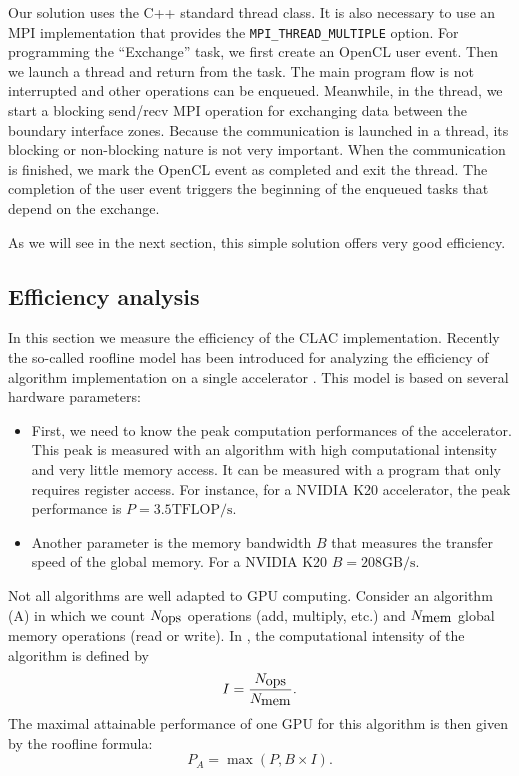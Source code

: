 \documentclass[12pt]{amsart}
\begin{document}
Our solution uses the C++ standard thread class. It is also necessary to use an MPI implementation that provides the
\texttt{MPI\_THREAD\_MULTIPLE}
 option.
 For programming the ``Exchange'' task, we first create an OpenCL user event.
 Then we launch a thread and return from the task.
 The main program flow is not interrupted and other operations can be enqueued. Meanwhile, in the thread, we start a blocking send/recv MPI operation for exchanging  data between the boundary interface zones.
 Because the communication is launched in a thread, its blocking or non-blocking nature is not very important.
 When the communication is finished, we mark the OpenCL event as completed and exit the thread.
 The completion of the user event  triggers the beginning of the enqueued tasks that depend on the exchange.

As we will see in the next section, this simple solution offers very
good efficiency.

\subsection{Efficiency analysis}
In this section we  measure the efficiency of the CLAC implementation. Recently the so-called roofline model has been introduced for analyzing the efficiency of algorithm implementation on a single accelerator \cite{williams2009roofline}. This model is based on several hardware parameters:
\begin{itemize}
\item First, we need to know the peak computation performances of the accelerator. This peak is measured with an algorithm with high computational intensity and very little memory access. It can be measured with a program that only requires register access. For instance, for a NVIDIA K20 accelerator, the peak performance is  $P=3.5\text{TFLOP/s}.$
\item Another parameter is the memory bandwidth $B$ that measures the transfer speed of the global memory. For a NVIDIA K20  $B=208\text{GB/s}.$\end{itemize}


Not all algorithms are well adapted to GPU computing. Consider an algorithm (A) in which we count $N_{\hbox{ops}}$ operations (add, multiply, etc.) and $N_{\hbox{mem}}$ global memory operations (read or write). In \cite{williams2009roofline}, the computational intensity of the algorithm is defined by
$$I=\frac{N_{\hbox{ops}}}{N_{\hbox{mem}}}.$$
The maximal attainable performance of one GPU for this algorithm is then given by the roofline formula:
\[
P_{A}=\max(P,B\times I).
\]
\end{document}
